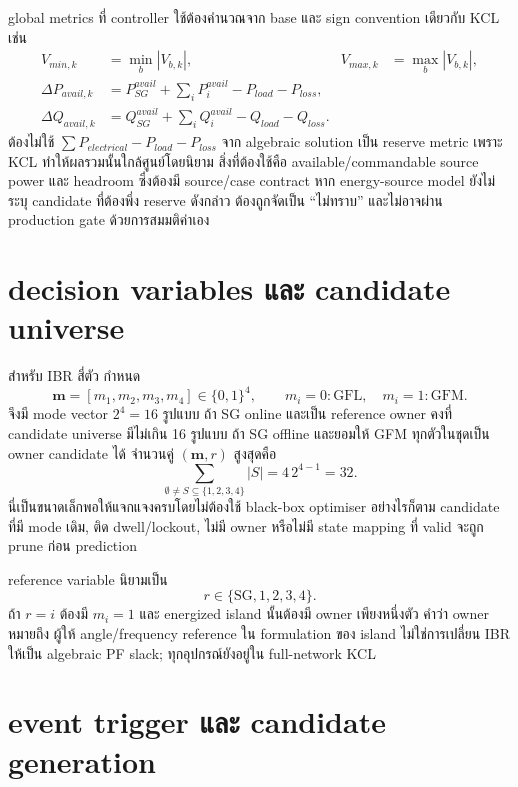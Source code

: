 \documentclass[12pt,a4paper]{article}
\begin{document}
global metrics ที่ controller ใช้ต้องคำนวณจาก base และ sign convention เดียวกับ KCL เช่น
\begin{align}
V_{min,k}&=\min_b |V_{b,k}|,& V_{max,k}&=\max_b |V_{b,k}|,\\
\Delta P_{avail,k}&=P_{SG}^{avail}+\sum_iP_i^{avail}-P_{load}-P_{loss},\\
\Delta Q_{avail,k}&=Q_{SG}^{avail}+\sum_iQ_i^{avail}-Q_{load}-Q_{loss}.
\end{align}
ต้องไม่ใช้ $\sum P_{electrical}-P_{load}-P_{loss}$ จาก algebraic solution เป็น reserve metric เพราะ KCL
ทำให้ผลรวมนั้นใกล้ศูนย์โดยนิยาม สิ่งที่ต้องใช้คือ available/commandable source power และ headroom
ซึ่งต้องมี source/case contract หาก energy-source model ยังไม่ระบุ candidate ที่ต้องพึ่ง reserve ดังกล่าว
ต้องถูกจัดเป็น ``ไม่ทราบ'' และไม่อาจผ่าน production gate ด้วยการสมมติค่าเอง

\section{decision variables และ candidate universe}

สำหรับ IBR สี่ตัว กำหนด
\begin{equation}
\mathbf m=[m_1,m_2,m_3,m_4]\in\{0,1\}^4,
\qquad m_i=0:\mathrm{GFL},\quad m_i=1:\mathrm{GFM}.
\end{equation}
จึงมี mode vector $2^4=16$ รูปแบบ ถ้า SG online และเป็น reference owner คงที่ candidate universe
มีไม่เกิน 16 รูปแบบ ถ้า SG offline และยอมให้ GFM ทุกตัวในชุดเป็น owner candidate ได้ จำนวนคู่
$(\mathbf m,r)$ สูงสุดคือ
\begin{equation}
\sum_{\emptyset\ne S\subseteq\{1,2,3,4\}}|S|
=4\,2^{4-1}=32.
\end{equation}
นี่เป็นขนาดเล็กพอให้แจกแจงครบโดยไม่ต้องใช้ black-box optimiser อย่างไรก็ตาม candidate ที่มี
mode เดิม, ติด dwell/lockout, ไม่มี owner หรือไม่มี state mapping ที่ valid จะถูก prune ก่อน prediction

reference variable นิยามเป็น
\begin{equation}
r\in\{\mathrm{SG},1,2,3,4\}.
\end{equation}
ถ้า $r=i$ ต้องมี $m_i=1$ และ energized island นั้นต้องมี owner เพียงหนึ่งตัว คำว่า owner หมายถึง
ผู้ให้ angle/frequency reference ใน formulation ของ island ไม่ใช่การเปลี่ยน IBR ให้เป็น algebraic PF slack;
ทุกอุปกรณ์ยังอยู่ใน full-network KCL

\section{event trigger และ candidate generation}
\end{document}
